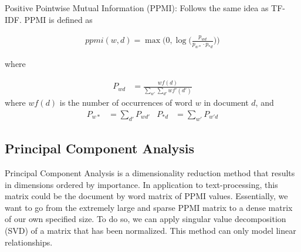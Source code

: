 Positive Pointwise Mutual Information (PPMI): Follows the same idea as TF-IDF. 	PPMI is defined  as 

\begin{align*}
\textit{ppmi}(w,d) = \max \big(0, \log\big(\frac{p_{wd}}{p_{w*} \cdotp p_{*d}}\big)\big)
\end{align*}

where

\begin{align*}
P_{wd} &= \frac{{wf}(d)}{\sum_{w'} \sum_{d'} {wf'}(d')}
\end{align*}
where ${wf}(d)$ is the number of occurrences of word $w$ in document $d$, and
\begin{align*}
P_{w*} &= \sum_{d'} P_{wd'} &
P_{*d} &= \sum_{w'} P_{w'd}
\end{align*}

\subsection{Principal Component Analysis}

Principal Component Analysis is a dimensionality reduction method that results in dimensions ordered by importance. In application to text-processing, this matrix could be the document by word matrix of PPMI values. Essentially, we want to go from the extremely large and sparse PPMI matrix to a dense matrix of our own specified size. To do so, we can apply singular value decomposition (SVD) of a matrix that has been normalized. This method can only model linear relationships.







